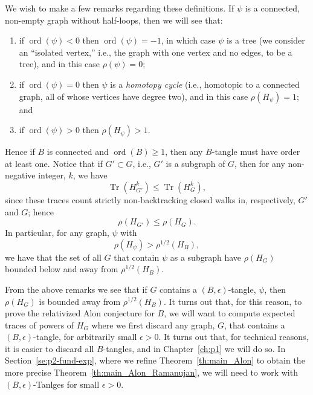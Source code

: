 \documentclass{memo-l}
\theoremstyle{plain}
\theoremstyle{definition}
\numberwithin{section}{chapter}
\numberwithin{equation}{chapter}
\newcommand{\rhoroot}[1]{\rho^{1/2}(H_{#1})}
\DeclareMathOperator{\ord}{ord}
\DeclareMathOperator{\Tr}{Tr}
\theoremstyle{plain}
\theoremstyle{definition}
\begin{document}
We wish to make a few remarks regarding these definitions.
If $\psi$ is a connected, non-empty graph without half-loops,
then we will see that:
\begin{enumerate}
\item if $\ord(\psi)<0$ then $\ord(\psi)=-1$, in which case
$\psi$ is a tree (we consider an ``isolated vertex,'' i.e., the graph
with one vertex and no edges, to be a tree), and in this case
$\rho(\psi)=0$; 
\item if $\ord(\psi)=0$ then $\psi$ is a {\em homotopy cycle} (i.e., 
homotopic to a connected graph, all
of whose vertices have degree two), and in this case $\rho(H_\psi)=1$; and
\item if $\ord(\psi)>0$ then $\rho(H_\psi)>1$.
\end{enumerate}
Hence if $B$ is connected and
$\ord(B)\ge 1$, then any $B$-tangle must have order at least one.
Notice that if $G'\subset G$, i.e., $G'$ is a subgraph of $G$, then
for any non-negative integer, $k$, we have
$$
\Tr(H_{G'}^k)\le \Tr(H_G^k),
$$
since these traces count strictly non-backtracking closed walks in,
respectively, $G'$ and $G$; hence
\begin{equation}\label{eq:rho_comparison}
\rho(H_{G'})\le \rho(H_G).
\end{equation}
In particular, for any graph, $\psi$ with
$$
\rho(H_\psi) > \rhoroot B,
$$
we have that the set of all $G$ that contain $\psi$ as a subgraph have
$\rho(H_G)$ bounded below and away from $\rhoroot B$.

From the above remarks we see that if $G$ contains a 
$(B,\epsilon)$-tangle, $\psi$, then $\rho(H_G)$ is bounded away
from $\rhoroot B$.  It turns out that, for this reason, 
to prove the relativized Alon conjecture for $B$, we will
want to compute expected traces of powers of $H_G$ where we first
discard any graph, $G$, that contains a $(B,\epsilon)$-tangle,
for arbitrarily small $\epsilon>0$.  It turns out that, for technical
reasons, it is easier to discard all $B$-tangles, and in
Chapter~\ref{ch:p1} we will do so.
In Section~\ref{se:p2-fund-exp}, where we refine
Theorem~\ref{th:main_Alon} to obtain the more precise
Theorem~\ref{th:main_Alon_Ramanujan}, we will need to work with
$(B,\epsilon)$-Tanlges for small $\epsilon>0$.
\end{document}
